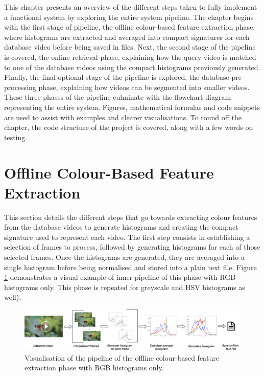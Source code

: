 This chapter presents an overview of the different steps taken to fully implement a functional system by exploring the entire system pipeline. The chapter begins with the first stage of pipeline, the offline colour-based feature extraction phase, where histograms are extracted and averaged into compact signatures for each database video before being saved in files. Next, the second stage of the pipeline is covered, the online retrieval phase, explaining how the query video is matched to one of the database videos using the compact histograms previously generated. Finally, the final optional stage of the pipeline is explored, the database pre-processing phase, explaining how videos can be segmented into smaller videos. These three phases of the pipeline culminate with the flowchart diagram representing the entire system. Figures, mathematical formulas and code snippets are used to assist with examples and clearer visualisations. To round off the chapter, the code structure of the project is covered, along with a few words on testing. 



\section{Offline Colour-Based Feature Extraction}
\label{sec:implementation-offline-colour-based-feature-extraction}

This section details the different steps that go towards extracting colour features from the database videos to generate histograms and creating the compact signature used to represent each video. The first step consists in establishing a selection of frames to process, followed by generating histograms for each of those selected frames. Once the histograms are generated, they are averaged into a single histogram before being normalised and stored into a plain text file. Figure \ref{fig:implementation-rgb_average_histogram_pipeline} demonstrates a visual example of inner pipeline of this phase with RGB histograms only. This phase is repeated for greyscale and HSV histograms as well).\\

\begin{figure}[h] 
\centerline{\includegraphics[width=1.2\textwidth,center]{figures/implementation/rgb_average_histogram_pipeline.png}}
\caption{\label{fig:implementation-rgb_average_histogram_pipeline}Visualisation of the pipeline of the offline colour-based feature extraction phase with RGB histograms only.}
\end{figure}


